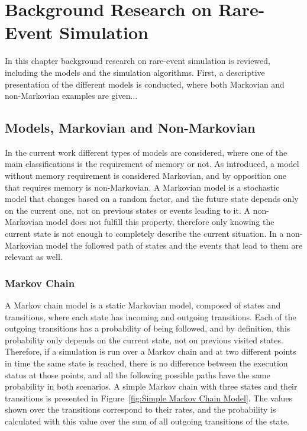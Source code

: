 
\chapter{Background Research on Rare-Event Simulation}  
\label{ch:Background Research on Rare Event Simulation}
In this chapter background research on rare-event simulation is reviewed, including the models and the simulation algorithms. First, a descriptive presentation of the different models is conducted, where both Markovian and non-Markovian examples are given...

\section{Models, Markovian and Non-Markovian}
\label{sec:Models, Markovian and Non-Markovian}
In the current work different types of models are considered, where one of the main classifications is the requirement of memory or not. As introduced, a model without memory requirement is considered Markovian, and by opposition one that requires memory is non-Markovian. A Markovian model is a stochastic model that changes based on a random factor, and the future state depends only on the current one, not on previous states or events leading to it. A non-Markovian model does not fulfill this property, therefore only knowing the current state is not enough to completely describe the current situation. In a non-Markovian model the followed path of states and the events that lead to them are relevant as well.

\subsection{Markov Chain}
\label{sub:Markov Chain}
A Markov chain model is a static Markovian model, composed of states and transitions, where each state has incoming and outgoing transitions. Each of the outgoing transitions has a probability of being followed, and by definition, this probability only depends on the current state, not on previous visited states. Therefore, if a simulation is run over a Markov chain and at two different points in time the same state is reached, there is no difference between the execution status at those points, and all the following possible paths have the same probability in both scenarios. A simple Markov chain with three states and their transitions is presented in Figure~\ref{fig:Simple Markov Chain Model}. The values shown over the transitions correspond to their rates, and the probability is calculated with this value over the sum of all outgoing transitions of the state.

